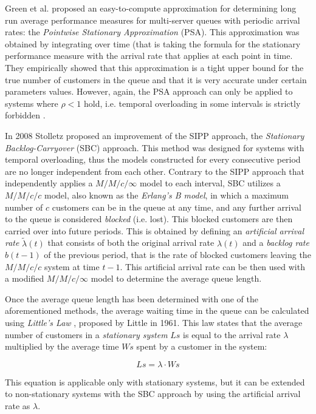 Green et al.\cite{green1991} proposed an easy-to-compute approximation for determining long run average performance measures for multi-server queues with periodic arrival rates: the \emph{Pointwise Stationary Approximation} (PSA). This approximation was obtained by integrating over time (that is taking the formula for the stationary performance measure with the arrival rate that applies at each point in time. They empirically showed that this approximation is a tight upper bound for the true number of customers in the queue and that it is very accurate under certain parameters values. However, again, the PSA approach can only be applied to systems where \( \rho < 1 \) hold, i.e. temporal overloading in some intervals is strictly forbidden \cite{stolletz}.

In 2008 Stolletz \cite{stolletz} proposed an improvement of the SIPP approach, the \emph{Stationary Backlog-Carryover} (SBC) approach. This method was designed for systems with temporal overloading, thus the models constructed for every consecutive period are no longer independent from each other. Contrary to the SIPP approach that independently applies a \( M/M/c/\infty \) model to each interval, SBC utilizes a \( M/M/c/c \) model, also known as the \emph{Erlang’s B model}, in which a maximum number of \( c \) customers can be in the queue at any time, and any further arrival to the queue is considered \emph{blocked} (i.e. lost). This blocked customers are then carried over into future periods. This is obtained by defining an \emph{artificial arrival rate} \( \widetilde{\lambda}(t) \) that consists of both the original arrival rate \( \lambda(t) \) and a \emph{backlog rate} \( b(t-1) \) of the previous period, that is the rate of blocked customers leaving the \( M/M/c/c \) system at time \( t-1 \). This artificial arrival rate can be then used with a modified \( M/M/c/\infty \) model to determine the average queue length.

Once the average queue length has been determined with one of the aforementioned methods, the average waiting time in the queue can be calculated using \emph{Little’s Law} \cite{little}, proposed by Little in 1961. This law states that the average number of customers in a \emph{stationary system} \( Ls \) is equal to the arrival rate \( \lambda \) multiplied by the average time \( Ws \) spent by a customer in the system:

\begin{equation}
  Ls = \lambda \cdot Ws
\end{equation}

This equation is applicable only with stationary systems, but it can be extended to non-stationary systems with the SBC approach by using the artificial arrival rate as \( \lambda \).

\clearpage